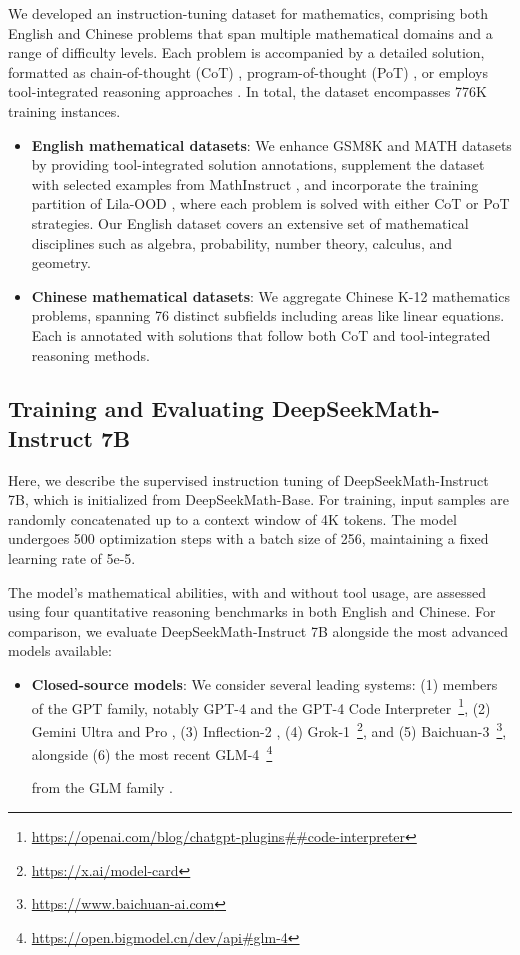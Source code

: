 We developed an instruction-tuning dataset for mathematics, comprising both English and Chinese problems that span multiple mathematical domains and a range of difficulty levels. Each problem is accompanied by a detailed solution, formatted as chain-of-thought (CoT) \citep{cot}, program-of-thought (PoT) \citep{pot,pal}, or employs tool-integrated reasoning approaches \citep{tora}. In total, the dataset encompasses 776K training instances.

\begin{itemize}[topsep=0pt]
    \item \textbf{English mathematical datasets}: We enhance GSM8K and MATH datasets by providing tool-integrated solution annotations, supplement the dataset with selected examples from MathInstruct \citep{MathInstruct}, and incorporate the training partition of Lila-OOD \citep{lila}, where each problem is solved with either CoT or PoT strategies. Our English dataset covers an extensive set of mathematical disciplines such as algebra, probability, number theory, calculus, and geometry.
    \item \textbf{Chinese mathematical datasets}: We aggregate Chinese K-12 mathematics problems, spanning 76 distinct subfields including areas like linear equations. Each is annotated with solutions that follow both CoT and tool-integrated reasoning methods.
\end{itemize}

\subsection{Training and Evaluating DeepSeekMath-Instruct 7B}

Here, we describe the supervised instruction tuning of DeepSeekMath-Instruct 7B, which is initialized from DeepSeekMath-Base. For training, input samples are randomly concatenated up to a context window of 4K tokens. The model undergoes 500 optimization steps with a batch size of 256, maintaining a fixed learning rate of 5e-5.

The model’s mathematical abilities, with and without tool usage, are assessed using four quantitative reasoning benchmarks in both English and Chinese. For comparison, we evaluate DeepSeekMath-Instruct 7B alongside the most advanced models available:

\begin{itemize}[topsep=0pt]
    \item \textbf{Closed-source models}: We consider several leading systems: (1) members of the GPT family, notably GPT-4 \citep{gpt4} and the GPT-4 Code Interpreter~\footnote{\url{https://openai.com/blog/chatgpt-plugins\#\#code-interpreter}}, (2) Gemini Ultra and Pro \citep{gemini}, (3) Inflection-2 \citep{inflection-2}, (4) Grok-1~\footnote{\url{https://x.ai/model-card}}, and (5) Baichuan-3~\footnote{\url{https://www.baichuan-ai.com}}, alongside (6) the most recent GLM-4~\footnote{\url{https://open.bigmodel.cn/dev/api\#glm-4}}
    
    from the GLM family \citep{glm}.
\end{itemize}

